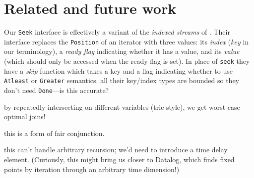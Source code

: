 \documentclass[acmsmall,screen,review,anonymous,dvipsnames,svgnames]{acmart}
\newcommand\hask[1]{\texttt{#1}}
\newcommand\todo[1]{{\color{Orange}#1}}
\renewcommand\todo[1]{{\color{IndianRed}#1}}
\begin{document}



\section{Related and future work}

Our \hask{Seek} interface is effectively a variant of the \emph{indexed streams} of \citet{indexed-streams}.
Their interface replaces the \hask{Position} of an iterator with three values: its \emph{index} (\emph{key} in our terminology), a \emph{ready flag} indicating whether it has a value, and its \emph{value} (which should only be accessed when the ready flag is set).
In place of \hask{seek} they have a \emph{skip} function which takes a key and a flag indicating whether to use \hask{Atleast} or \hask{Greater} semantics.
\todo{all their key/index types are bounded so they don't need \hask{Done}---is this accurate?}

\todo{by repeatedly intersecting on different variables (trie style), we get worst-case optimal joins!}

\todo{this is a form of fair conjunction.}

\todo{this can't handle arbitrary recursion; we'd need to introduce a time delay element. (Curiously, this might bring us closer to Datalog, which finds fixed points by iteration through an arbitrary time dimension!)}



\end{document}
